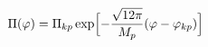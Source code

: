 \begin{equation} \label{k1}
\Pi(\varphi)=\Pi_{kp} \exp \Bigl[ - \frac{\sqrt{12
\pi}}{M_{p}}(\varphi-\varphi_{kp})\Bigr]
\end{equation}

